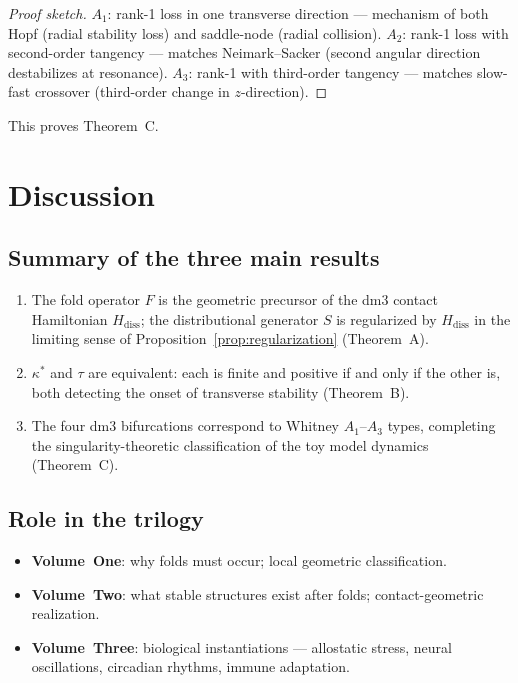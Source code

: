 \documentclass[12pt, oneside]{book}
\theoremstyle{plain}
\theoremstyle{definition}
\theoremstyle{remark}
\begin{document}
\begin{proof}[Proof sketch]
$A_1$: rank-1 loss in one transverse direction --- mechanism of
both Hopf (radial stability loss) and saddle-node (radial
collision). $A_2$: rank-1 loss with second-order tangency ---
matches Neimark--Sacker (second angular direction destabilizes
at resonance). $A_3$: rank-1 with third-order tangency ---
matches slow-fast crossover (third-order change in $z$-direction).
\end{proof}

This proves Theorem~C.

\section{Discussion}
\label{sec:discussion}

\subsection{Summary of the three main results}

\begin{enumerate}[label=(\arabic*)]
  \item The fold operator $F$ is the geometric precursor of the
        dm3 contact Hamiltonian $H_{\mathrm{diss}}$; the
        distributional generator $S$ is regularized by
        $H_{\mathrm{diss}}$ in the limiting sense of
        Proposition~\ref{prop:regularization} (Theorem~A).
  \item $\kappa^*$ and $\tau$ are equivalent: each is finite
        and positive if and only if the other is, both detecting
        the onset of transverse stability (Theorem~B).
  \item The four dm3 bifurcations correspond to Whitney
        $A_1$--$A_3$ types, completing the singularity-theoretic
        classification of the toy model dynamics (Theorem~C).
\end{enumerate}

\subsection{Role in the trilogy}

\begin{itemize}[leftmargin=*]
  \item \textbf{Volume~One}: why folds must occur;
        local geometric classification.
  \item \textbf{Volume~Two}: what stable structures exist after
        folds; contact-geometric realization.
  \item \textbf{Volume~Three}: biological instantiations ---
        allostatic stress, neural oscillations, circadian rhythms,
        immune adaptation.
\end{itemize}
\end{document}

